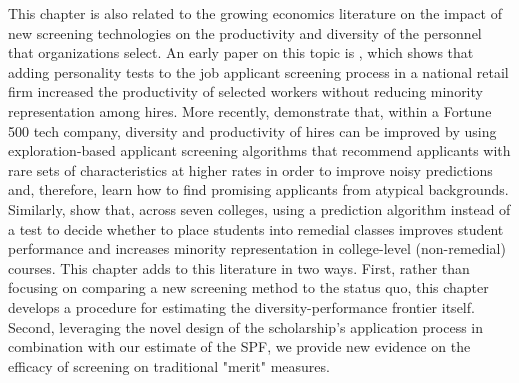 This chapter is also related to the growing economics literature on the impact of new screening technologies on the productivity and diversity of the personnel that organizations select. An early paper on this topic is \textcite{autor2008does}, which shows that adding personality tests to the job applicant screening process in a national retail firm increased the productivity of selected workers without reducing minority representation among hires. More recently, \textcite{li2020hiring} demonstrate that, within a Fortune 500 tech company, diversity and productivity of hires can be improved by using exploration-based applicant screening algorithms that recommend applicants with rare sets of characteristics at higher rates in order to improve noisy predictions and, therefore, learn how to find promising applicants from atypical backgrounds. Similarly, \textcite{bergman2021seven} show that, across seven colleges, using a prediction algorithm instead of a test to decide whether to place students into remedial classes improves student performance and increases minority representation in college-level (non-remedial) courses. This chapter adds to this literature in two ways. First, rather than focusing on comparing a new screening method to the status quo, this chapter develops a procedure for estimating the diversity-performance frontier itself. Second, leveraging the novel design of the scholarship's application process in combination with our estimate of the SPF, we provide new evidence on the efficacy of screening on traditional "merit" measures. 

